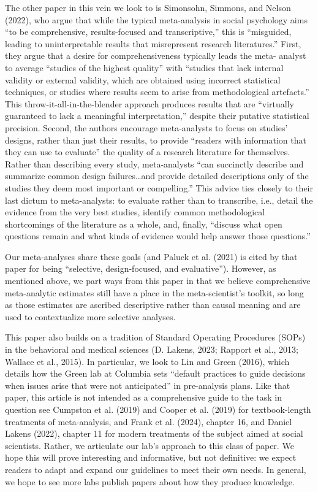 \documentclass[
  man]{apa6}
\begin{document}
The other paper in this vein we look to is Simonsohn, Simmons, and Nelson (2022), who argue that while the typical meta-analysis in social psychology aims ``to be comprehensive, results-focused and transcriptive,'' this is ``misguided, leading to uninterpretable results that misrepresent research literatures.'' First, they argue that a desire for comprehensiveness typically leads the meta- analyst to average ``studies of the highest quality'' with ``studies that lack internal validity or external validity, which are obtained using incorrect statistical techniques, or studies where results seem to arise from methodological artefacts.'' This throw-it-all-in-the-blender approach produces results that are ``virtually guaranteed to lack a meaningful interpretation,'' despite their putative statistical precision. Second, the authors encourage meta-analysts to focus on studies' designs, rather than just their results, to provide ``readers with information that they can use to evaluate'' the quality of a research literature for themselves. Rather than describing every study, meta-analysts ``can succinctly describe and summarize common design failures\ldots and provide detailed descriptions only of the studies they deem most important or compelling.'' This advice ties closely to their last dictum to meta-analysts: to evaluate rather than to transcribe, i.e., detail the evidence from the very best studies, identify common methodological shortcomings of the literature as a whole, and, finally, ``discuss what open questions remain and what kinds of evidence would help answer those questions.''

Our meta-analyses share these goals (and Paluck et al. (2021) is cited by that paper for being ``selective, design-focused, and evaluative''). However, as mentioned above, we part ways from this paper in that we believe comprehensive meta-analytic estimates still have a place in the meta-scientist's toolkit, so long as those estimates are ascribed descriptive rather than causal meaning and are used to contextualize more selective analyses.

This paper also builds on a tradition of Standard Operating Procedures (SOPs) in the behavioral and medical sciences (D. Lakens, 2023; Rapport et al., 2013; Wallace et al., 2015). In particular, we look to Lin and Green (2016), which details how the Green lab at Columbia sets ``default practices to guide decisions when issues arise that were not anticipated'' in pre-analysis plans. Like that paper, this article is not intended as a comprehensive guide to the task in question \textemdash see Cumpston et al. (2019) and Cooper et al. (2019) for textbook-length treatments of meta-analysis, and Frank et al. (2024), chapter 16, and Daniel Lakens (2022), chapter 11 for modern treatments of the subject aimed at social scientists. Rather, we articulate our lab's approach to this class of paper. We hope this will prove interesting and informative, but not definitive: we expect readers to adapt and expand our guidelines to meet their own needs. In general, we hope to see more labs publish papers about how they produce knowledge.
\end{document}
